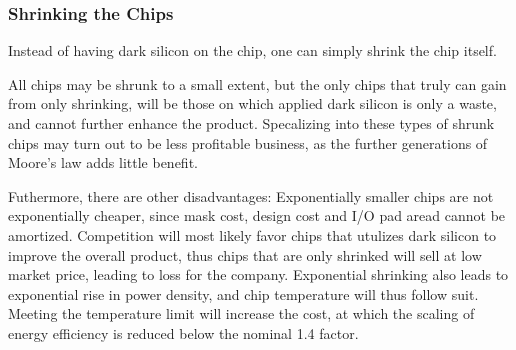 \subsubsection{Shrinking the Chips}

Instead of having dark silicon on the chip, one can simply shrink the chip itself.


All chips may be shrunk to a small extent, but the only chips that truly can gain from only shrinking, will be those on which applied dark silicon is only a waste, and cannot further enhance the product.   
Specalizing into these types of shrunk chips may turn out to be less profitable business, as the further generations of Moore's law adds little benefit. 

Futhermore, there are other disadvantages: Exponentially smaller chips are not exponentially cheaper, since mask cost, design cost and I/O pad aread cannot be amortized. 
Competition will most likely favor chips that utulizes dark silicon to improve the overall product, thus chips that are only shrinked will sell at low market price, leading to loss for the company.
Exponential shrinking also leads to exponential rise in power density, and chip temperature will thus follow suit.
Meeting the temperature limit will increase the cost, at which the scaling of energy efficiency is reduced below the nominal 1.4 factor.



